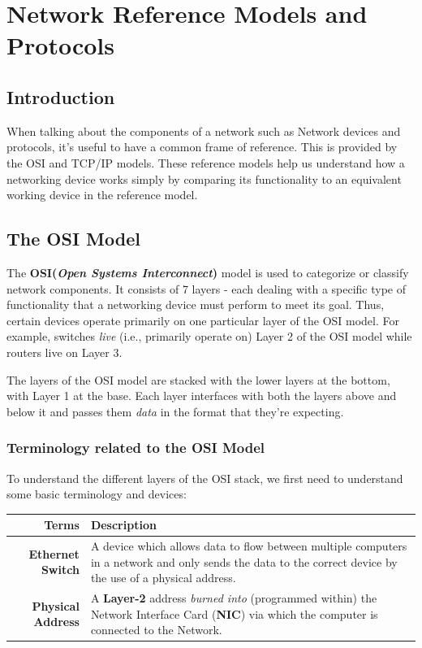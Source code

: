 \chapter{Network Reference Models and Protocols}
\section{Introduction}
When talking about the components of a network such as Network devices and protocols, it's useful to have a common frame of reference. This is provided by the OSI and TCP/IP models. These reference models help us understand how a networking device works simply by comparing its functionality to an equivalent working device in the reference model. 

\section{The OSI Model}
The \textbf{OSI(\textit{Open Systems Interconnect})} model is used to categorize or classify network components. It consists of 7 layers - each dealing with a specific type of functionality that a networking device must perform to meet its goal. Thus, certain devices operate primarily on one particular layer of the OSI model. For example, switches \textit{live} (i.e., primarily operate on) Layer 2 of the OSI model while routers live on Layer 3. 

The layers of the OSI model are stacked with the lower layers at the bottom, with Layer 1 at the base. Each layer interfaces with both the layers above and below it and passes them \textit{data} in the format that they're expecting. 

\subsection{Terminology related to the OSI Model}

To understand the different layers of the OSI stack, we first need to understand some basic terminology and devices:

\noindent
\begin{tabular}{rM{0.73}}
	\toprule
	\textbf{Terms} &\textbf{Description} \\
	\midrule
	\textbf{Ethernet Switch}	&A device which allows data to flow between multiple computers in a network and only sends the data to the correct device by the use of a physical address.\\
	\midrule
	\textbf{Physical Address}	&A \textbf{Layer-2} address \textit{burned into} (programmed within) the Network Interface Card (\textbf{NIC}) via which the computer is connected to the Network.\\
	\bottomrule
\end{tabular}

